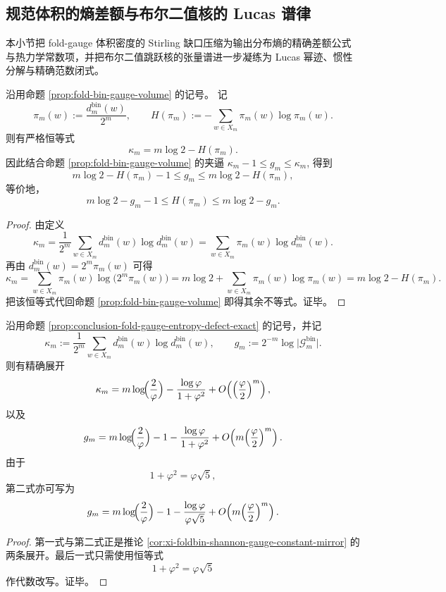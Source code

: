 \subsection{规范体积的熵差额与布尔二值核的 Lucas 谱律}\label{subsec:conclusion-fold-gauge-entropy-gap-boolean-lucas-kernel}
本小节把 fold-gauge 体积密度的 Stirling 缺口压缩为输出分布熵的精确差额公式与热力学常数项，并把布尔二值跳跃核的张量谱进一步凝练为 Lucas 幂迹、惯性分解与精确范数闭式。

\begin{proposition}\label{prop:conclusion-fold-gauge-entropy-defect-exact}
沿用命题 \ref{prop:fold-bin-gauge-volume} 的记号。
记
\[
\pi_m(w):=\frac{d_m^{\mathrm{bin}}(w)}{2^m},
\qquad
H(\pi_m):=-\sum_{w\in X_m}\pi_m(w)\log \pi_m(w).
\]
则有严格恒等式
\[
\kappa_m=m\log 2-H(\pi_m).
\]
因此结合命题 \ref{prop:fold-bin-gauge-volume} 的夹逼
\(
\kappa_m-1\le g_m\le \kappa_m
\),
得到
\[
m\log 2-H(\pi_m)-1\le g_m\le m\log 2-H(\pi_m),
\]
等价地，
\[
m\log 2-g_m-1\le H(\pi_m)\le m\log 2-g_m.
\]
\end{proposition}
\begin{proof}
由定义
\[
\kappa_m
=
\frac{1}{2^m}\sum_{w\in X_m}d_m^{\mathrm{bin}}(w)\log d_m^{\mathrm{bin}}(w)
=
\sum_{w\in X_m}\pi_m(w)\log d_m^{\mathrm{bin}}(w).
\]
再由
\(
d_m^{\mathrm{bin}}(w)=2^m\pi_m(w)
\)
可得
\[
\kappa_m
=
\sum_{w\in X_m}\pi_m(w)\log\bigl(2^m\pi_m(w)\bigr)
=
m\log 2+\sum_{w\in X_m}\pi_m(w)\log \pi_m(w)
=
m\log 2-H(\pi_m).
\]
把该恒等式代回命题 \ref{prop:fold-bin-gauge-volume} 即得其余不等式。证毕。
\end{proof}

\begin{theorem}[规范体积密度的精确常数项]\label{thm:conclusion-fold-gauge-entropy-density-exact-constant}
沿用命题 \ref{prop:conclusion-fold-gauge-entropy-defect-exact} 的记号，并记
\[
\kappa_m:=\frac{1}{2^m}\sum_{w\in X_m}d_m^{\mathrm{bin}}(w)\log d_m^{\mathrm{bin}}(w),
\qquad
g_m:=2^{-m}\log\bigl|\mathcal G_m^{\mathrm{bin}}\bigr|.
\]
则有精确展开
\[
\kappa_m
=
m\log\!\Bigl(\frac{2}{\varphi}\Bigr)
-\frac{\log\varphi}{1+\varphi^2}
+O\!\left(\Bigl(\frac{\varphi}{2}\Bigr)^m\right),
\]
以及
\[
g_m
=
m\log\!\Bigl(\frac{2}{\varphi}\Bigr)
-1
-\frac{\log\varphi}{1+\varphi^2}
+O\!\left(m\Bigl(\frac{\varphi}{2}\Bigr)^m\right).
\]
由于
\[
1+\varphi^2=\varphi\sqrt5,
\]
第二式亦可写为
\[
g_m
=
m\log\!\Bigl(\frac{2}{\varphi}\Bigr)
-1
-\frac{\log\varphi}{\varphi\sqrt5}
+O\!\left(m\Bigl(\frac{\varphi}{2}\Bigr)^m\right).
\]
\end{theorem}
\begin{proof}
第一式与第二式正是推论 \ref{cor:xi-foldbin-shannon-gauge-constant-mirror} 的两条展开。最后一式只需使用恒等式
\[
1+\varphi^2=\varphi\sqrt5
\]
作代数改写。证毕。
\end{proof}

